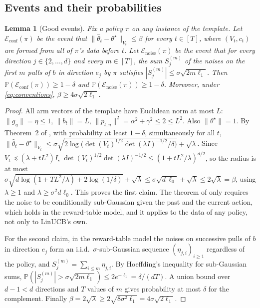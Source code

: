 \documentclass{article}
\newtheorem{lemma}{Lemma}
\theoremstyle{definition}
\theoremstyle{remark}
\newcommand{\Prb}{\mathbb{P}}
\theoremstyle{remark}
\begin{document}
\subsection{Events and their probabilities}

\begin{lemma}[Good events]
\label{lem:cat-events}
Fix a policy $\pi$ on any instance of the template. Let
$\mathcal E_{\mathrm{conf}}(\pi)$ be the event that
$\|\widehat\theta_t-\theta^\star\|_{V_t}\le\beta$ for every $t\in[T]$, where
$(V_t,c_t)$ are formed from all of $\pi$'s data before $t$. Let
$\mathcal E_{\mathrm{noise}}(\pi)$ be the event that for every direction
$j\in\{2,\dots,d\}$ and every $m\in[T]$, the sum $S_j^{(m)}$ of the noises on
the first $m$ pulls of $b$ in direction $e_j$ by $\pi$ satisfies
$|S_j^{(m)}|\le\sigma\sqrt{2m\ell_1}$. Then
$\Prb(\mathcal E_{\mathrm{conf}}(\pi))\ge1-\delta$ and
$\Prb(\mathcal E_{\mathrm{noise}}(\pi))\ge1-\delta$. Moreover, under
\eqref{eq:conventions}, $\beta\ge4\sigma\sqrt{2\ell_1}$.
\end{lemma}

\begin{proof}
All arm vectors of the template have Euclidean norm at most $L$: $\|g_\eta\|=\eta\le1$,
$\|b_t\|=L$, $\|p_{t,\eta}\|^2=\alpha^2+\gamma^2\le2\le L^2$. Also $\|\theta^\star\|=1$.
By Theorem~2 of \cite{abbasi2011improved}, with probability at least
$1-\delta$, simultaneously for all $t$,
$\|\widehat\theta_t-\theta^\star\|_{V_t}\le\sigma\sqrt{2\log\bigl(\det(V_t)^{1/2}\det(\lambda I)^{-1/2}/\delta\bigr)}+\sqrt\lambda$.
Since $V_t\preceq(\lambda+tL^2)I$, $\det(V_t)^{1/2}\det(\lambda I)^{-1/2}\le(1+tL^2/\lambda)^{d/2}$,
so the radius is at most
$\sigma\sqrt{d\log(1+TL^2/\lambda)+2\log(1/\delta)}+\sqrt\lambda\le\sigma\sqrt{d\,\ell_0}+\sqrt\lambda\le2\sqrt\lambda=\beta$,
using $\lambda\ge1$ and $\lambda\ge\sigma^2d\ell_0$. This proves the first claim.
The theorem of \cite{abbasi2011improved} only requires the noise to be
conditionally sub-Gaussian given the past and the current action, which holds
in the reward-table model, and it applies to the data of any policy, not only
to LinUCB's own.

For the second claim, in the reward-table model the noises on successive pulls
of $b$ in direction $e_j$ form an i.i.d.\ $\sigma$-sub-Gaussian sequence
$(\eta_{j,i})_{i\ge1}$ regardless of the policy, and $S_j^{(m)}=\sum_{i\le m}\eta_{j,i}$.
By Hoeffding's inequality for sub-Gaussian sums,
$\Prb(|S_j^{(m)}|>\sigma\sqrt{2m\ell_1})\le2e^{-\ell_1}=\delta/(dT)$. A union
bound over $d-1<d$ directions and $T$ values of $m$ gives probability at most
$\delta$ for the complement. Finally $\beta=2\sqrt\lambda\ge2\sqrt{8\sigma^2\ell_1}=4\sigma\sqrt{2\ell_1}$.
\end{proof}
\end{document}
